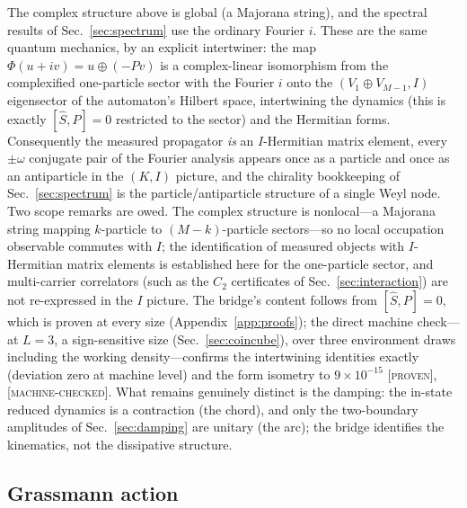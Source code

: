 \documentclass[aps,prd,twocolumn,superscriptaddress,nofootinbib,floatfix]{revtex4-2}
\newcommand{\evP}{\textnormal{\textsc{[proven]}}}
\newcommand{\evM}{\textnormal{\textsc{[machine-checked]}}}
\begin{document}
The complex structure above is global (a Majorana string), and the
spectral results of Sec.~\ref{sec:spectrum} use the ordinary Fourier $i$.
These are the same quantum mechanics, by an explicit intertwiner: the map
$\Phi(u+iv)=u\oplus(-Pv)$ is a complex-linear isomorphism from the
complexified one-particle sector with the Fourier $i$ onto the
$(V_1\oplus V_{M-1},I)$ eigensector of the automaton's Hilbert space,
intertwining the dynamics (this is exactly $[\hat S,P]=0$ restricted to
the sector) and the Hermitian forms. Consequently the measured propagator
\emph{is} an $I$-Hermitian matrix element, every $\pm\omega$ conjugate
pair of the Fourier analysis appears once as a particle and once as an
antiparticle in the $(K,I)$ picture, and the chirality bookkeeping of
Sec.~\ref{sec:spectrum} is the particle/antiparticle structure of a
single Weyl node. Two scope remarks are owed. The complex structure is
nonlocal---a Majorana string mapping $k$-particle to $(M{-}k)$-particle
sectors---so no local occupation observable commutes with $I$; the
identification of measured objects with $I$-Hermitian matrix elements is
established here for the one-particle sector, and multi-carrier
correlators (such as the $C_2$ certificates of
Sec.~\ref{sec:interaction}) are not re-expressed in the $I$ picture.
The bridge's content follows from $[\hat S,P]=0$, which is proven at
every size (Appendix~\ref{app:proofs}); the direct machine check---at
$L=3$, a sign-sensitive size (Sec.~\ref{sec:coincube}), over three
environment draws including the working density---confirms the
intertwining identities exactly (deviation zero at machine level) and
the form isometry to $9\times10^{-15}$ \evP{}, \evM{}. What remains genuinely distinct is the damping: the
in-state reduced dynamics is a contraction (the chord), and only the
two-boundary amplitudes of Sec.~\ref{sec:damping} are unitary (the arc);
the bridge identifies the kinematics, not the dissipative structure.

\subsection{Grassmann action}
\end{document}
